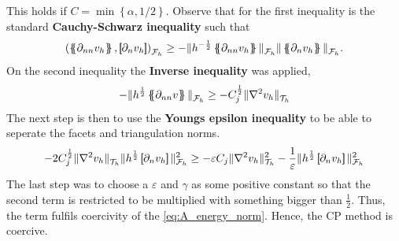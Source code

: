 This holds if $C=\min\left\{  \alpha , 1 /2\right\}$.
Observe that for the first inequality is the standard \textbf{Cauchy-Schwarz inequality} such that $$\left( \mean{ \partial_{nn} v_{h} }  , \jump{ \partial _{n} v_{h} }   \right) _{\mathcal{F} _{h}} \ge - \| h^{-\frac{1}{2}} \mean{ \partial _{nn}
v_{h} }    \|_{\mathcal{F}_{h}   }^{  } \| \mean{ \partial _{n}v_{h} }   \|_{ \mathcal{F}_{h}   }^{  } .  $$ On the second inequality the \textbf{Inverse inequality} was applied,
\[
- \| h^{\frac{1}{2}} \left\{\!\!\left\{ \partial _{nn}v \right\}\!\!\right\}   \|_{ \mathcal{F} _{h}  }^{  }\ge - C_{j}^{\frac{1}{2}} \| \nabla ^2 v_{h} \|_{ \mathcal{T} _{h} }^{  }
\]
The next step is then to use the \textbf{Youngs epsilon inequality} to be able to seperate the facets and triangulation norms. \[
 - 2 C^{\frac{1}{2}}_{j} \|  \nabla ^2 v_{h}    \|_{ \mathcal{T} _{h}  }^{  } \| h^{\frac{1}{2}} \jump{ \partial _{n} v_{h} }   \|_{ \mathcal{F} _{h} }^{2  } \ge- \varepsilon C_{j} \| \nabla ^2 v_{h} \|_{ \mathcal{T} _{h} }^{2  } -
 \frac{1}{\varepsilon } \| h^{\frac{1}{2}} \jump{ \partial _{n} v_{h} }   \|_{ \mathcal{F} _{h} }^{2  }
\]
The last step was to choose a $\varepsilon $ and $\gamma $ as some positive constant so that the second term is restricted to be multiplied with something bigger than $\frac{1}{2}$. Thus, the term fulfils coercivity of the \eqref{eq:A_energy_norm}. Hence, the CP method is coercive.

